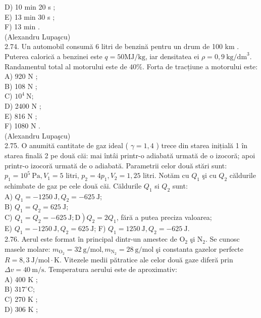 \documentclass[10pt]{article}
\begin{document}
D) 10 min 20 s ;\\
E) 13 min 30 s ;\\
F) 13 min .\\
(Alexandru Lupaşcu)\\
2.74. Un automobil consumă 6 litri de benzină pentru un drum de 100 km . Puterea calorică a benzinei este $q=50 \mathrm{MJ} / \mathrm{kg}$, iar densitatea ei $\rho=0,9 \mathrm{~kg} / \mathrm{dm}^{3}$. Randamentul total al motorului este de $40 \%$. Forta de tracțiune a motorului este:\\
A) 920 N ;\\
B) 108 N ;\\
C) $10^{4} \mathrm{~N}$;\\
D) 2400 N ;\\
E) 816 N ;\\
F) 1080 N .\\
(Alexandru Lupaşcu)\\
2.75. O anumită cantitate de gaz ideal ( $\gamma=1,4$ ) trece din starea inițială 1 în starea finală 2 pe două căi: mai întâi printr-o adiabată urmată de o izocoră; apoi printr-o izocoră urmată de o adiabată. Parametrii celor două stări sunt: $p_{1}=10^{5} \mathrm{~Pa}, V_{1}=5$ litri, $p_{2}=4 p_{1}, V_{2}=1,25$ litri. Notăm cu $Q_{1}$ şi cu $Q_{2}$ căldurile schimbate de gaz pe cele două căi. Căldurile $Q_{1}$ si $Q_{2}$ sunt:\\
A) $Q_{1}=-1250 \mathrm{~J}, Q_{2}=-625 \mathrm{~J}$;\\
B) $Q_{1}=Q_{2}=625 \mathrm{~J}$;\\
C) $\left.Q_{1}=Q_{2}=-625 \mathrm{~J} ; \mathrm{D}\right) Q_{2}=2 Q_{1}$, fără a putea preciza valoarea;\\
E) $Q_{1}=-1250 \mathrm{~J}, Q_{2}=625 \mathrm{~J}$; F) $Q_{1}=1250 \mathrm{~J}, Q_{2}=-625 \mathrm{~J}$.\\
2.76. Aerul este format în principal dintr-un amestec de $\mathrm{O}_{2}$ şi $\mathrm{N}_{2}$. Se cunosc masele molare: $m_{\mathrm{O}_{2}}=32 \mathrm{~g} / \mathrm{mol}, m_{\mathrm{N}_{2}}=28 \mathrm{~g} / \mathrm{mol}$ şi constanta gazelor perfecte $R=8,3 \mathrm{~J} / \mathrm{mol} \cdot \mathrm{K}$. Vitezele medii pătratice ale celor două gaze diferă prin $\Delta v=40 \mathrm{~m} / \mathrm{s}$. Temperatura aerului este de aproximativ:\\
A) 400 K ;\\
B) $317^{\circ} \mathrm{C}$;\\
C) 270 K ;\\
D) 306 K ;\\
\end{document}
